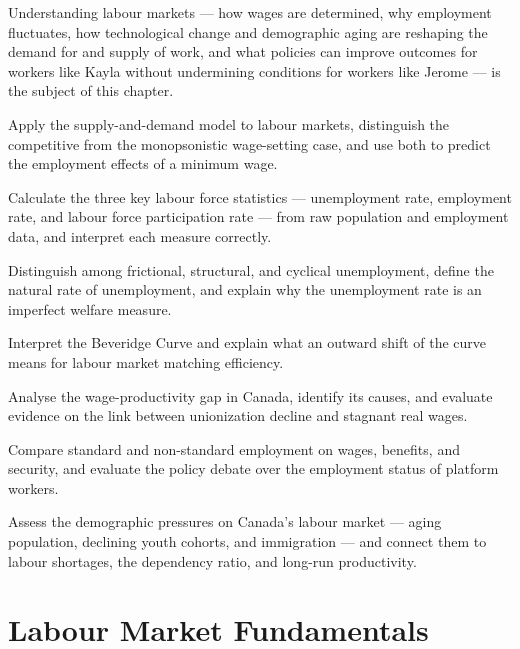 Understanding labour markets --- how wages are determined, why employment
fluctuates, how technological change and demographic aging are reshaping
the demand for and supply of work, and what policies can improve outcomes
for workers like Kayla without undermining conditions for workers like
Jerome --- is the subject of this chapter.


\begin{learningobjectives}
  \item Apply the supply-and-demand model to labour markets, distinguish
        the competitive from the monopsonistic wage-setting case, and
        use both to predict the employment effects of a minimum wage.
  \item Calculate the three key labour force statistics --- unemployment
        rate, employment rate, and labour force participation rate ---
        from raw population and employment data, and interpret each
        measure correctly.
  \item Distinguish among frictional, structural, and cyclical
        unemployment, define the natural rate of unemployment, and
        explain why the unemployment rate is an imperfect welfare measure.
  \item Interpret the Beveridge Curve and explain what an outward shift
        of the curve means for labour market matching efficiency.
  \item Analyse the wage-productivity gap in Canada, identify its causes,
        and evaluate evidence on the link between unionization decline
        and stagnant real wages.
  \item Compare standard and non-standard employment on wages, benefits,
        and security, and evaluate the policy debate over the employment
        status of platform workers.
  \item Assess the demographic pressures on Canada's labour market ---
        aging population, declining youth cohorts, and immigration ---
        and connect them to labour shortages, the dependency ratio, and
        long-run productivity.
\end{learningobjectives}

\section{Labour Market Fundamentals}
\label{sec:labour_fundamentals}

